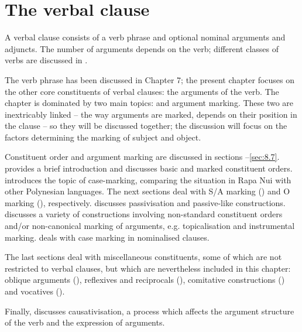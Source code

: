 \chapter[The verbal clause]{The verbal clause}\label{ch:8}
A verbal clause consists of a verb phrase and optional nominal arguments and adjuncts. The number of arguments depends on the verb; different classes of verbs are discussed in . 

The verb phrase has been discussed in Chapter 7; the present chapter focuses on the other core constituents of verbal clauses: the arguments of the verb. The chapter is dominated by two main topics:  and argument marking. These two are inextricably linked – the way arguments are marked, depends on their position in the clause – so they will be discussed together; the discussion will focus on the factors determining the marking of subject and object. 

Constituent order and argument marking are discussed in sections –\ref{sec:8.7}.  provides a brief introduction and discusses basic and marked constituent orders.  introduces the topic of case-marking, comparing the situation in Rapa Nui with other Polynesian languages. The next sections deal with S/A marking () and O marking (), respectively.  discusses passivisation and passive-like constructions.  discusses a variety of constructions involving non-standard constituent orders and/or non-canonical marking of arguments, e.g. topicalisation and instrumental marking.  deals with case marking in nominalised clauses. 

The last sections deal with miscellaneous constituents, some of which are not restricted to verbal clauses, but which are nevertheless included in this chapter: oblique arguments (), reflexives and reciprocals (), comitative constructions () and vocatives (). 

Finally,  discusses causativisation, a process which affects the argument structure of the verb and the expression of arguments. 

